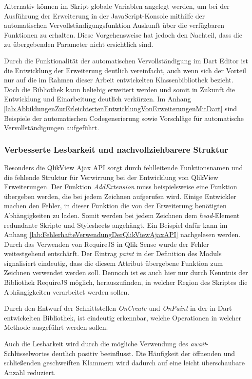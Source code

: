 Alternativ können im Skript globale Variablen angelegt werden, um bei der Ausführung der Erweiterung in der JavaScript-Konsole mithilfe der automatischen Vervollständigungsfunktion Auskunft über die verfügbaren Funktionen zu erhalten. Diese Vorgehensweise hat jedoch den Nachteil, dass die zu übergebenden Parameter nicht ersichtlich sind. 

Durch die Funktionalität der automatischen Vervollständigung im Dart Editor ist die Entwicklung der Erweiterung deutlich vereinfacht, auch wenn sich der Vorteil nur auf die im Rahmen dieser Arbeit entwickelten Klassen\-bibliothek bezieht. Doch die Bibliothek kann beliebig erweitert werden und somit in Zukunft die Entwicklung und Einarbeitung deutlich verkürzen. Im Anhang \ref{lab:AbbildungenZurErleichtertenEntwicklungVonErweiterungenMitDart} sind Beispiele der automatischen Codegenerierung sowie Vorschläge für automatische Vervollständigungen aufgeführt.

\subsubsection{Verbesserte Lesbarkeit und nachvollziehbarere Struktur}


Besonders die QlikView Ajax API sorgt durch fehlleitende Funktionsnamen und die fehlende Struktur für Verwirrung bei der Entwicklung von QlikView Erweiterungen. Der Funktion \textit{AddExtension} muss beispielsweise eine Funktion übergeben werden, die bei jedem Zeichnen aufgerufen wird. Einige Entwickler machen den Fehler, in dieser Funktion die von der Erweiterung benötigten Abhängig\-keiten zu laden. Somit werden bei jedem Zeichnen dem \textit{head}-Element redundante Skripte und Stylesheets angehängt. Ein Beispiel dafür kann im Anhang \ref{lab:FehlerhafteVerwendungDerQlikViewAjaxAPI} nachgelesen werden. Durch das Verwenden von RequireJS in Qlik Sense wurde der Fehler weitestgehend entschärft. Der Eintrag \textit{paint} in der Definition des Moduls signalisiert eindeutig, dass die diesem Attribut übergebene Funktion zum Zeichnen verwendet werden soll. Dennoch ist es auch hier nur durch Kenntnis der Bibliothek RequireJS möglich, herauszufinden, in welcher Region des Skriptes die Abhängig\-keiten verarbeitet werden sollen.

Durch den Entwurf der Schnittstellen \textit{OnCreate} und \textit{OnPaint} in der in Dart entwickelten Bibliothek, ist eindeutig erkennbar, welche Operationen in welcher Methode ausgeführt werden sollen.

Auch die Lesbar\-keit wird durch die mögliche Verwendung des \textit{await}-Schlüsselwortes deutlich positiv beeinflusst. Die Häufig\-keit der öffnenden und schließenden geschweiften Klammern wird dadurch auf eine leicht überschaubare Anzahl reduziert.

